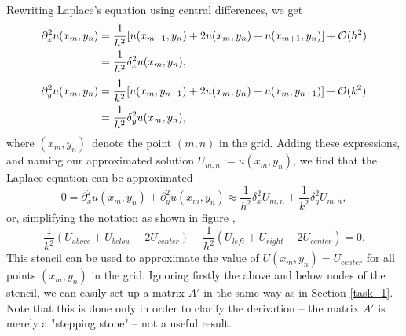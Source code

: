 Rewriting Laplace's equation using central differences, we get
\begin{equation*}
    \begin{split}
    \partial^2_x u(x_m, y_n) 
        &= \frac{1}{h^2}[u(x_{m-1},y_n) + 2u(x_m,y_n) + u(x_{m+1},y_n)] + \mathcal{O}(h^2)\\
        &= \frac{1}{h^2}\delta^2_x u(x_m,y_n),\\
    \end{split}
\end{equation*}
\begin{equation*}
    \begin{split}
    \partial^2_y u(x_m, y_n) 
        &= \frac{1}{k^2}[u(x_{m},y_{n-1}) + 2u(x_m,y_n) + u(x_{m},y_{n+1})] + \mathcal{O}(k^2)\\
        &= \frac{1}{h^2}\delta^2_y u(x_m,y_n),\\
    \end{split}
\end{equation*}
where $(x_m, y_n)$ denote the point $(m,n)$ in the grid. 
Adding these expressions, and naming our approximated solution $U_{m,n} := u(x_m,y_n)$, we find that the Laplace equation can be approximated 
\begin{equation*}
    0 = \partial^2_x u(x_m,y_n) + \partial^2_y u(x_m,y_n)
    \approx \frac{1}{h^2}\delta^2_x U_{m,n} + \frac{1}{k^2}\delta^2_y U_{m,n},
\end{equation*}
or, simplifying the notation as shown in figure %
,
\begin{equation*}
    \frac{1}{k^2}(U_{above} + U_{below} - 2U_{center}) + \frac{1}{h^2}(U_{left} + U_{right} - 2U_{center}) = 0.
\end{equation*}
This stencil can be used to approximate the value of $U(x_m, y_n) = U_{center}$ for all points $(x_m, y_n)$ in the grid.
Ignoring firstly the above and below nodes of the stencil, we can easily set up a matrix $A'$ in the same way as in Section \ref{task_1}.
Note that this is done only in order to clarify the derivation -- the matrix $A'$ is merely a "stepping stone" -- not a useful result.
